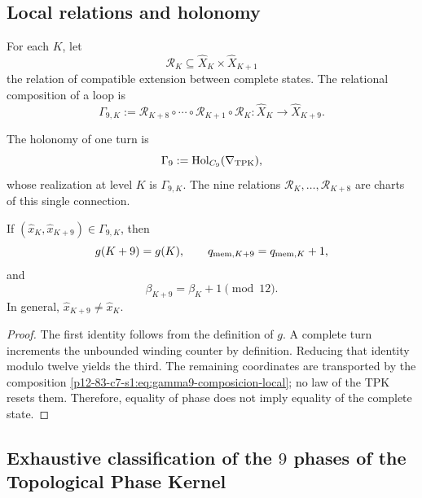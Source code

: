 \subsection{Local relations and holonomy}

For each \(K\), let
\[
 \mathcal R_K\subseteq
 \widehat X_K\times\widehat X_{K+1}
\]
the relation of compatible extension between complete states. The relational composition of a loop is
\begin{equation}
 \Gamma_{9,K}
 :=\mathcal R_{K+8}\circ\cdots\circ\mathcal R_{K+1}\circ\mathcal R_K
 :\widehat X_K\longrightarrow\widehat X_{K+9}.
\label{p12-83-c7-s1:eq:gamma9-composicion-local}
\end{equation}

\begin{definition}
\label{p12-83-c7-s1:def:holonomia-nonadica}
The holonomy of one turn is
\[
 \Gamma_9:=\operatorname{Hol}_{C_9}(\nabla_{\rm TPK}),
\]
whose realization at level \(K\) is
\(\Gamma_{9,K}\). The nine relations \(\mathcal R_K,\ldots,
\mathcal R_{K+8}\) are charts of this single connection.
\end{definition}

\begin{theorem}
\label{p12-83-c7-s1:thm:retorno-nonadico-sin-reinicio}
If \((\widehat x_K,\widehat x_{K+9})\in\Gamma_{9,K}\), then
\[
 g(K+9)=g(K),
 \qquad
 q_{{\rm mem},K+9}=q_{{\rm mem},K}+1,
\]
and
\[
 \beta_{K+9}=\beta_K+1\pmod{12}.
\]
In general, \(\widehat x_{K+9}\neq\widehat x_K\).
\end{theorem}

\begin{proof}
The first identity follows from the definition of \(g\). A complete turn increments the unbounded winding counter by definition. Reducing that identity modulo twelve yields the third. The remaining coordinates are transported by the composition \cref{p12-83-c7-s1:eq:gamma9-composicion-local}; no law of the TPK resets them. Therefore, equality of phase does not imply equality of the complete state.
\end{proof}

\subsection{Exhaustive classification of the \(9\) phases of the Topological Phase Kernel}

